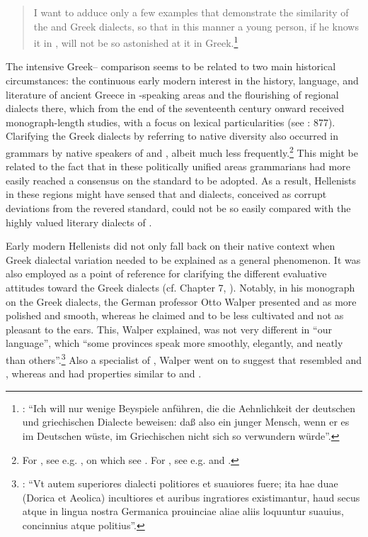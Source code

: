 \begin{quote}
I want to adduce only a few examples that demonstrate the similarity of the  and Greek dialects, so that in this manner a young person, if he knows it in , will not be so astonished at it in Greek.\footnote{\citet[229]{Scheller1772}: “Ich will nur wenige Beyspiele anführen, die die Aehnlichkeit der deutschen und griechischen Dialecte beweisen: daß also ein junger Mensch, wenn er es im Deutschen wüste, im Griechischen nicht sich so verwundern würde”.}
\end{quote}

The intensive Greek– comparison seems to be related to two main historical circumstances: the continuous early modern interest in the history, language, and literature of ancient Greece in -speaking areas and the flourishing of regional dialects there, which from the end of the seventeenth century onward received monograph-length studies, with a focus on lexical particularities (see \citealt{Hasler2009}: 877). Clarifying the Greek dialects by referring to native  diversity also occurred in grammars by native speakers of  and , albeit much less frequently.\footnote{For , see e.g. \citet[11--12]{Antesignanus1554}, on which see \citet{VanRooy2016c}. For , see e.g. \citet[191--192]{Milner1734} and \citet[121]{Holmes1735}.} This might be related to the fact that in these politically unified areas grammarians had more easily reached a consensus on the  standard to be adopted. As a result, Hellenists in these regions might have sensed that  and  dialects, conceived as corrupt deviations from the revered standard, could not be so easily compared with the highly valued literary dialects of .

Early modern Hellenists did not only fall back on their native context when Greek dialectal variation needed to be explained as a general phenomenon. It was also employed as a point of reference for clarifying the different evaluative attitudes toward the Greek dialects (cf. Chapter 7, ). Notably, in his monograph on the Greek dialects, the German professor Otto Walper presented  and  as more polished and smooth, whereas he claimed  and  to be less cultivated and not as pleasant to the ears. This, Walper explained, was not very different in “our  language”, which “some provinces speak more smoothly, elegantly, and neatly than others”.\footnote{\citet[61]{Walper1589}: “Vt autem superiores dialecti politiores et suauiores fuere; ita hae duae (Dorica et Aeolica) incultiores et auribus ingratiores existimantur, haud secus atque in lingua nostra Germanica prouinciae aliae aliis loquuntur suauius, concinnius atque politius”.} Also a specialist of , Walper went on to suggest that  resembled  and , whereas  and  had properties similar to  and .

